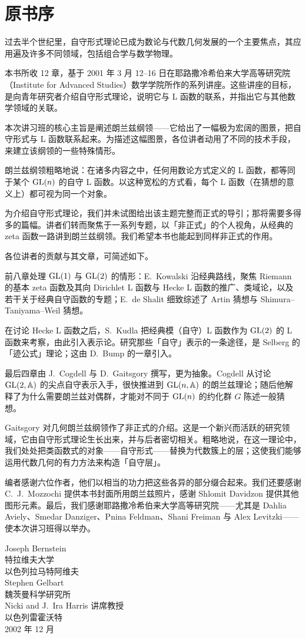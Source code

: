 \chapter*{原书序}

过去半个世纪里，自守形式理论已成为数论与代数几何发展的一个主要焦点，其应用遍及许多不同领域，包括组合学与数学物理。

本书所收 12 章，基于 2001 年 3 月 12--16 日在耶路撒冷希伯来大学高等研究院（Institute for Advanced Studies）数学学院所作的系列讲座。这些讲座的目标，是向青年研究者介绍自守形式理论，说明它与 L 函数的联系，并指出它与其他数学领域的关联。

本次讲习班的核心主旨是阐述朗兰兹纲领——它给出了一幅极为宏阔的图景，把自守形式与 L 函数联系起来。为描述这幅图景，各位讲者动用了不同的技术手段，来建立该纲领的一些特殊情形。

朗兰兹纲领粗略地说：在诸多内容之中，任何用数论方式定义的 L 函数，都等同于某个 $\mathrm{GL}(n)$ 的自守 L 函数。以这种宽松的方式看，每个 L 函数（在猜想的意义上）都可视为同一个对象。

为介绍自守形式理论，我们并未试图给出该主题完整而正式的导引；那将需要多得多的篇幅。讲者们转而聚焦于一系列专题，以「非正式」的个人视角，从经典的 zeta 函数一路讲到朗兰兹纲领。我们希望本书也能起到同样非正式的作用。

各位讲者的贡献与其文章，可简述如下。

前八章处理 $\mathrm{GL}(1)$ 与 $\mathrm{GL}(2)$ 的情形：E.~Kowalski 沿经典路线，聚焦 Riemann 的基本 zeta 函数及其向 Dirichlet L 函数与 Hecke L 函数的推广、类域论，以及若干关于经典自守函数的专题；E.~de Shalit 细致综述了 Artin 猜想与 Shimura--Taniyama--Weil 猜想。

在讨论 Hecke L 函数之后，S.~Kudla 把经典模（自守）L 函数作为 $\mathrm{GL}(2)$ 的 L 函数来考察，由此引入表示论。研究那些「自守」表示的一条途径，是 Selberg 的「迹公式」理论；这由 D.~Bump 的一章引入。

最后四章由 J.~Cogdell 与 D.~Gaitsgory 撰写，更为抽象。Cogdell 从讨论 $\mathrm{GL}(2,\mathbb{A})$ 的尖点自守表示入手，很快推进到 $\mathrm{GL}(n,\mathbb{A})$ 的朗兰兹理论；随后他解释了为什么需要朗兰兹对偶群，才能对不同于 $\mathrm{GL}(n)$ 的约化群 $G$ 陈述一般猜想。

Gaitsgory 对几何朗兰兹纲领作了非正式的介绍。这是一个新兴而活跃的研究领域，它由自守形式理论生长出来，并与后者密切相关。粗略地说，在这一理论中，我们处处把类函数式的对象——自守形式——替换为代数簇上的层；这使我们能够运用代数几何的有力方法来构造「自守层」。

编者感谢六位作者，他们以相当的功力把这些各异的部分缀合起来。我们还要感谢 C.~J.~Mozzochi 提供本书封面所用朗兰兹照片，感谢 Shlomit Davidzon 提供其他图形元素。最后，我们感谢耶路撒冷希伯来大学高等研究院——尤其是 Dahlia Aviely、Smedar Danziger、Pnina Feldman、Shani Freiman 与 Alex Levitzki——使本次讲习班得以举办。

\vspace{1.2em}
\begin{flushright}
Joseph Bernstein\\
特拉维夫大学\\
以色列拉马特阿维夫\\[0.8em]
Stephen Gelbart\\
魏茨曼科学研究所\\
Nicki and J.~Ira Harris 讲席教授\\
以色列雷霍沃特\\[0.8em]
2002 年 12 月
\end{flushright}
